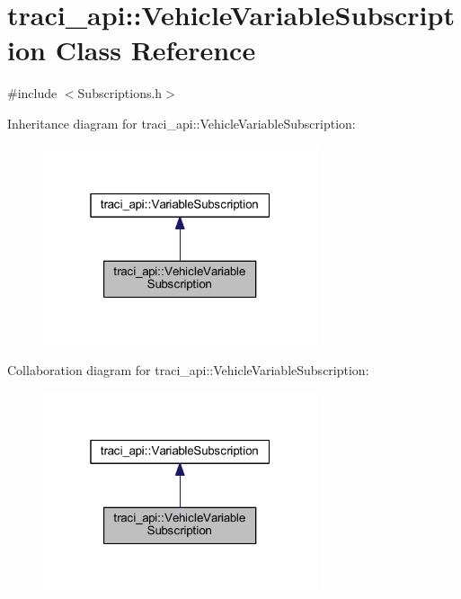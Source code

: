 \hypertarget{classtraci__api_1_1_vehicle_variable_subscription}{}\section{traci\+\_\+api\+:\+:Vehicle\+Variable\+Subscription Class Reference}
\label{classtraci__api_1_1_vehicle_variable_subscription}


{\ttfamily \#include $<$Subscriptions.\+h$>$}



Inheritance diagram for traci\+\_\+api\+:\+:Vehicle\+Variable\+Subscription\+:\nopagebreak
\begin{figure}[H]
\begin{center}
\leavevmode
\includegraphics[width=229pt]{classtraci__api_1_1_vehicle_variable_subscription__inherit__graph}
\end{center}
\end{figure}


Collaboration diagram for traci\+\_\+api\+:\+:Vehicle\+Variable\+Subscription\+:\nopagebreak
\begin{figure}[H]
\begin{center}
\leavevmode
\includegraphics[width=229pt]{classtraci__api_1_1_vehicle_variable_subscription__coll__graph}
\end{center}
\end{figure}
